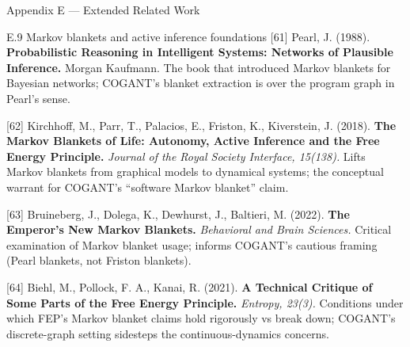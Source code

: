 \documentclass[
  ignorenonframetext,
]{beamer}
\begin{document}
\begin{frame}[fragile]{Appendix E --- Extended Related Work}
\begin{block}{E.9 Markov blankets and active inference foundations}
{[}61{]} Pearl, J. (1988). \textbf{Probabilistic Reasoning in
Intelligent Systems: Networks of Plausible Inference.} Morgan Kaufmann.
The book that introduced Markov blankets for Bayesian networks; COGANT's
blanket extraction is over the program graph in Pearl's sense.

{[}62{]} Kirchhoff, M., Parr, T., Palacios, E., Friston, K., Kiverstein,
J. (2018). \textbf{The Markov Blankets of Life: Autonomy, Active
Inference and the Free Energy Principle.} \emph{Journal of the Royal
Society Interface, 15(138).} Lifts Markov blankets from graphical models
to dynamical systems; the conceptual warrant for COGANT's ``software
Markov blanket'' claim.

{[}63{]} Bruineberg, J., Dolega, K., Dewhurst, J., Baltieri, M. (2022).
\textbf{The Emperor's New Markov Blankets.} \emph{Behavioral and Brain
Sciences.} Critical examination of Markov blanket usage; informs
COGANT's cautious framing (Pearl blankets, not Friston blankets).

{[}64{]} Biehl, M., Pollock, F. A., Kanai, R. (2021). \textbf{A
Technical Critique of Some Parts of the Free Energy Principle.}
\emph{Entropy, 23(3).} Conditions under which FEP's Markov blanket
claims hold rigorously vs break down; COGANT's discrete-graph setting
sidesteps the continuous-dynamics concerns.
\end{block}
\end{frame}

\begin{frame}
\end{frame}
\end{document}
